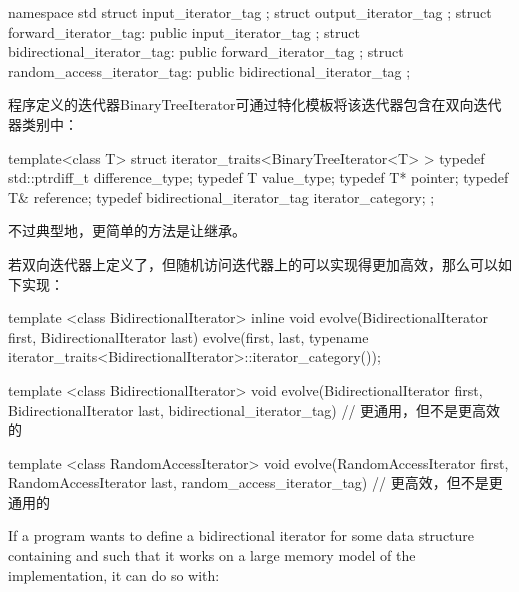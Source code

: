 \begin{codeblock}
namespace std {
  struct input_iterator_tag { };
  struct output_iterator_tag { };
  struct forward_iterator_tag: public input_iterator_tag { };
  struct bidirectional_iterator_tag: public forward_iterator_tag { };
  struct random_access_iterator_tag: public bidirectional_iterator_tag { };
}
\end{codeblock}

\pnum
{}%
%
%
%
%
%
\enterexample
程序定义的迭代器{BinaryTreeIterator}可通过特化模板将该迭代器包含在双向迭代器类别中：

\begin{codeblock}
template<class T> struct iterator_traits<BinaryTreeIterator<T> > {
  typedef std::ptrdiff_t difference_type;
  typedef T value_type;
  typedef T* pointer;
  typedef T& reference;
  typedef bidirectional_iterator_tag iterator_category;
};
\end{codeblock}

不过典型地，更简单的方法是让继承。
\exitexample

\pnum
\enterexample
若双向迭代器上定义了，但随机访问迭代器上的可以实现得更加高效，那么可以如下实现：

\begin{codeblock}
template <class BidirectionalIterator>
inline void
evolve(BidirectionalIterator first, BidirectionalIterator last) {
  evolve(first, last,
    typename iterator_traits<BidirectionalIterator>::iterator_category());
}

template <class BidirectionalIterator>
void evolve(BidirectionalIterator first, BidirectionalIterator last,
  bidirectional_iterator_tag) {
  // 更通用，但不是更高效的
}

template <class RandomAccessIterator>
void evolve(RandomAccessIterator first, RandomAccessIterator last,
  random_access_iterator_tag) {
  // 更高效，但不是更通用的
}
\end{codeblock}
\exitexample

\pnum
\enterexample
If a \Cpp program wants to define a bidirectional iterator for some data structure containing
and such that it
works on a large memory model of the implementation, it can do so with:

